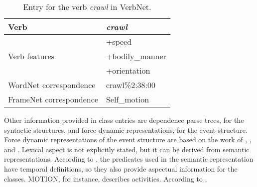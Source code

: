 \documentclass[english]{textolivre}
\begin{document}
\addtocounter{footnote}{-3} %

\begin{table}[h!]
\centering
\begin{threeparttable}
\caption{Entry for the verb \textit{crawl} in VerbNet.}
\label{Table2}
\begin{tabular}{ll}
\toprule
Verb & \textit{crawl} \\
\midrule
\multirow{3}{*}{Verb features} & +speed \\
& +bodily\_manner \\
& +orientation \\
WordNet correspondence & crawl\%2:38:00 \\
FrameNet correspondence	& Self\_motion\\
\bottomrule
\end{tabular}
\end{threeparttable}
\end{table}

Other information provided in class entries are dependence parse trees, for the syntactic structures, and force dynamic representations, for the event structure. Force dynamic representations of the event structure are based on the work of \textcite{croft_verbsaspect_2012}, \textcite{croft_constructions_2017}, and \textcite{kalm_event_2019}. Lexical aspect is not explicitly stated, but it can be derived from semantic representations. According to \textcite{kipper_large-scale_2008}, the predicates used in the semantic representation have temporal definitions, so they also provide aspectual information for the classes. MOTION, for instance, describes activities. According to \textcite[p.~25]{kipper_large-scale_2008},
\end{document}
